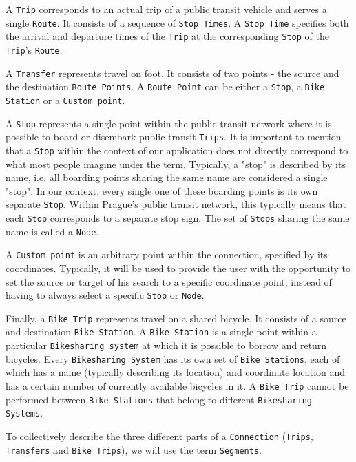 A \texttt{Trip} corresponds to an actual trip of a public transit vehicle and serves a single \texttt{Route}. It consists of a sequence of \texttt{Stop Times}. A \texttt{Stop Time} specifies both the arrival and departure times of the \texttt{Trip} at the corresponding \texttt{Stop} of the \texttt{Trip}'s \texttt{Route}.

A \texttt{Transfer} represents travel on foot. It consists of two points - the source and the destination \texttt{Route Points}. A \texttt{Route Point} can be either a \texttt{Stop}, a \texttt{Bike Station} or a \texttt{Custom point}.

A \texttt{Stop} represents a single point within the public transit network where it is possible to board or disembark public transit \texttt{Trips}. It is important to mention that a \texttt{Stop} within the context of our application does not directly correspond to what most people imagine under the term. Typically, a "stop" is described by its name, i.e. all boarding points sharing the same name are considered a single "stop". In our context, every single one of these boarding points is its own separate \texttt{Stop}. Within Prague's public transit network, this typically means that each \texttt{Stop} corresponds to a separate stop sign. The set of \texttt{Stops} sharing the same name is called a \texttt{Node}.

A \texttt{Custom point} is an arbitrary point within the connection, specified by its coordinates. Typically, it will be used to provide the user with the opportunity to set the source or target of his search to a specific coordinate point, instead of having to always select a specific \texttt{Stop} or \texttt{Node}.

Finally, a \texttt{Bike Trip} represents travel on a shared bicycle. It consists of a source and destination \texttt{Bike Station}. A \texttt{Bike Station} is a single point within a particular \texttt{Bikesharing system} at which it is possible to borrow and return bicycles. Every \texttt{Bikesharing System} has its own set of \texttt{Bike Stations}, each of which has a name (typically describing its location) and coordinate location and has a certain number of currently available bicycles in it. A \texttt{Bike Trip} cannot be performed between \texttt{Bike Stations} that belong to different \texttt{Bikesharing Systems}.

To collectively describe the three different parts of a \texttt{Connection} (\texttt{Trips}, \texttt{Transfers} and \texttt{Bike Trips}), we will use the term \texttt{Segments}.


